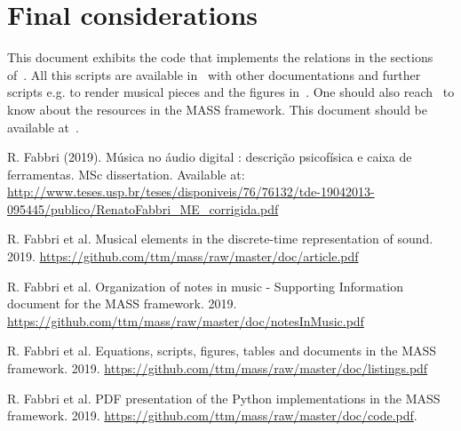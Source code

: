 \documentclass{article}
\begin{document}
\section{Final considerations}
This document exhibits the code that implements the relations
in the sections of~\cite{massArticle,massNotesInMusic}.
All this scripts are available in~\cite{massRepo} with
other documentations and further scripts e.g. to render musical
pieces and the figures in~\cite{massArticle}.
One should also reach~\cite{massListings} to know
about the resources in the MASS framework.
This document should be available at~\cite{massCode}.

\begin{thebibliography}{9}
    R. Fabbri (2019). M\'usica no \'audio digital : descri\c{c}\~ao psicof\'isica e caixa de ferramentas. MSc dissertation. Available at: \url{http://www.teses.usp.br/teses/disponiveis/76/76132/tde-19042013-095445/publico/RenatoFabbri_ME_corrigida.pdf}

  R. Fabbri et al.
  Musical elements in the discrete-time representation of sound. 2019.
    \url{https://github.com/ttm/mass/raw/master/doc/article.pdf}

  R. Fabbri et al.
  Organization of notes in music - Supporting Information document for the MASS framework. 2019.
    \url{https://github.com/ttm/mass/raw/master/doc/notesInMusic.pdf}

  R. Fabbri et al.
  Equations, scripts, figures, tables and documents in the MASS framework. 2019.
    \url{https://github.com/ttm/mass/raw/master/doc/listings.pdf}

  R. Fabbri et al.
  PDF presentation of the Python implementations in the MASS framework. 2019.
    \url{https://github.com/ttm/mass/raw/master/doc/code.pdf}.

\end{thebibliography}
\end{document}
